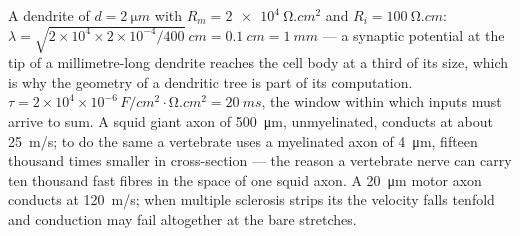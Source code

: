 \begin{example}\label{ex:b3:nervous-systems:numbers}
A dendrite of $d = \qty{2}{\micro m}$ with $R_{m} = \qty{2e4}{\ohm.cm^2}$
and $R_{i} = \qty{100}{\ohm.cm}$: $\lambda = \sqrt{2\times 10^{4}\times
2\times 10^{-4}/400}\ \unit{cm} = \qty{0.1}{cm} = \qty{1}{mm}$ --- a
synaptic potential at the tip of a millimetre-long dendrite reaches the
cell body at a third of its size, which is why the geometry of a
dendritic tree is part of its computation. $\tau = 2\times 10^{4}\times
10^{-6}\,\unit{F/cm^2}\cdot\unit{\ohm.cm^2} = \qty{20}{ms}$, the window
within which inputs must arrive to sum. A squid giant axon of
\qty{500}{\micro m}, unmyelinated, conducts at about \qty{25}{m/s}; to do
the same a vertebrate uses a myelinated axon of \qty{4}{\micro m},
fifteen thousand times smaller in cross-section --- the reason a
vertebrate nerve can carry ten thousand fast fibres in the space of one
squid axon. A \qty{20}{\micro m} motor axon conducts at
\qty{120}{m/s}; when multiple sclerosis strips its  the velocity
falls tenfold and conduction may fail altogether at the bare stretches.
\end{example}


